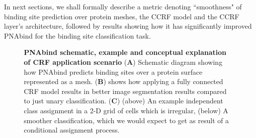 In next sections, we shall formally describe a metric denoting ``smoothness" of binding site prediction over protein meshes, the CCRF model and the CCRF layer's architecture, followed by results showing how it has significantly improved PNAbind for the binding site classification task.
\begin{center} 
 \begin{figure}[!htp]
        \caption[PNAbind schematic, example and conceptual explanation of CRF application scenario]{\textbf{PNAbind schematic, example and conceptual explanation of CRF application scenario}
        ({\bf A}) Schematic diagram showing how PNAbind predicts binding sites over a protein surface represented as a mesh. ({\bf B}) \citet{krahenbuhl2012efficient} shows how applying a fully connected CRF model results in better image segmentation results compared to 
        just unary classification. ({\bf C}) (above) An example independent class assignment in a 2-D grid of cells which is irregular, (below) A smoother classification, which we would 
        expect to get as result of a conditional assignment process.}
        \label{fig:crf_concept} \end{figure} \end{center}

